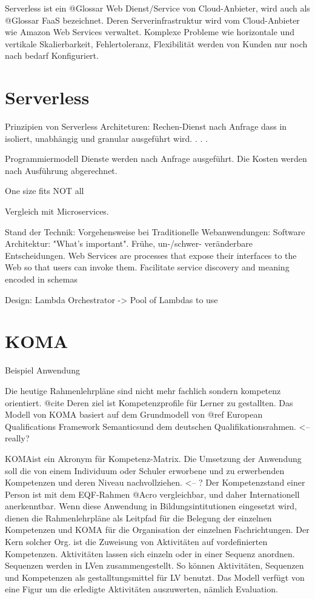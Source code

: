 \documentclass[
12pt,
english,
ngerman,
headsepline,
twoside,
openright,
numbers=noenddot,version=first
]{scrreprt}
\begin{document}
Serverless ist ein @Glossar Web Dienst/Service von Cloud-Anbieter, wird auch als @Glossar FaaS bezeichnet. Deren Serverinfrastruktur wird vom Cloud-Anbieter wie Amazon Web Services verwaltet. Komplexe Probleme wie horizontale und vertikale Skalierbarkeit, Fehlertoleranz, Flexibilität werden von Kunden nur noch nach bedarf Konfiguriert. 


\section{Serverless}
\label{sec:serverless}
Prinzipien von Serverless Architeturen: \cite{sbarski2017serverless}
Rechen-Dienst nach Anfrage dass in isoliert, unabhängig und granular ausgeführt wird. 
. . .



Programmiermodell 
Dienste werden nach Anfrage ausgeführt. 
Die Kosten werden nach Ausführung abgerechnet. 

One size fits NOT all

Vergleich mit Microservices.


Stand der Technik: 
Vorgehensweise bei Traditionelle Webanwendungen:  
Software Architektur: "What's important". Frühe, un-/schwer- veränderbare Entscheidungen.
Web Services are processes that expose their interfaces to the Web so that users can invoke them. Facilitate service discovery and meaning encoded in schemas


Design: Lambda Orchestrator -> Pool of Lambdas to use

\section{KOMA}{Beispiel Anwendung}
\label{sec:KOMA}

Die heutige Rahmenlehrpläne sind nicht mehr fachlich sondern kompetenz orientiert. @cite Deren ziel ist Kompetenzprofile
für Lerner zu gestallten. Das Modell von KOMA basiert auf dem Grundmodell von
@ref \glqq European Qualifications Framework Semantics\grqq und dem deutschen Qualifikationsrahmen. <-- really?

\glqq KOMA\grqq ist ein Akronym für Kompetenz-Matrix. Die Umsetzung der Anwendung soll die von einem Individuum oder Schuler
erworbene und zu erwerbenden Kompetenzen und deren Niveau nachvollziehen. <-- ?
Der Kompetenzstand einer Person ist mit dem EQF-Rahmen @Acro vergleichbar, und daher Internationell anerkenntbar.
Wenn diese Anwendung in Bildungsintitutionen eingesetzt wird, dienen die Rahmenlehrpläne als Leitpfad für die Belegung der einzelnen Kompetenzen
und KOMA für die Organisation der einzelnen Fachrichtungen. Der Kern solcher Org. ist die Zuweisung von Aktivitäten auf vordefinierten Kompetenzen.
Aktivitäten lassen sich einzeln oder in einer Sequenz anordnen. Sequenzen werden in LVen zusammengestellt. So können Aktivitäten, Sequenzen und Kompetenzen
als gestalltungsmittel für LV benutzt. Das Modell verfügt von eine Figur um die erledigte Aktivitäten auszuwerten, nämlich Evaluation.
\end{document}
